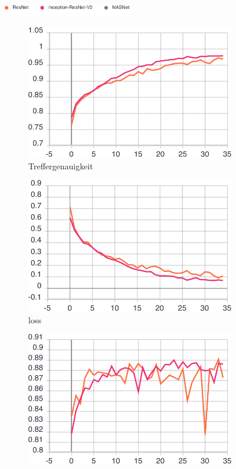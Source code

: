 \begin{figure}[ht] 
  \captionsetup{width=.8\linewidth}
  \caption{Statistiken aus dem Training der Bild-basierten Klassifizierung von Rechnungen mit den ResNet, Inception-ResNetV2 und NASNet Netzwerken.}
  \label{image-class-results} 
  \includegraphics[width=0.5\textwidth]{graphics/image-classification-results/legend.pdf}
  \begin{subfigure}[b]{0.5\linewidth}
    \centering
    \includegraphics[width=0.75\linewidth]{graphics/image-classification-results/acc.pdf} 
    \caption{Treffergenauigkeit} 
    \label{image-class-results:a} 
    \vspace{2ex}
  \end{subfigure}%
  \begin{subfigure}[b]{0.5\linewidth}
    \centering
    \includegraphics[width=0.75\linewidth]{graphics/image-classification-results/loss.pdf} 
    \caption{loss} 
    \label{image-class-results:b} 
    \vspace{2ex}
  \end{subfigure} 
  \begin{subfigure}[b]{0.5\linewidth}
    \centering
    \includegraphics[width=0.75\linewidth]{graphics/image-classification-results/val_acc.pdf} 

\end{subfigure}
\end{figure}
